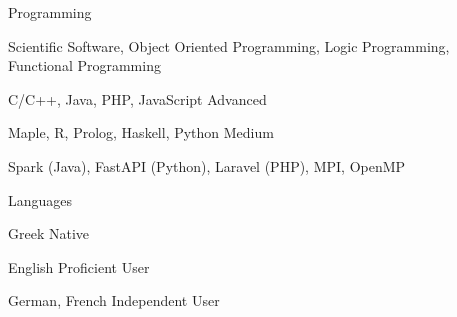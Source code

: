 

\begin{cvskills}


  \cvskill
    {Programming} %
    {
	   	\begin{cvitems}
	   		\item {Scientific Software, Object Oriented Programming, Logic Programming, Functional Programming}
	   		\item {C/C++, Java, PHP, JavaScript {\enskip\cdotp\enskip} Advanced}
	   		\item {Maple, R, Prolog, Haskell, Python {\enskip\cdotp\enskip} Medium}
	   		\item {Spark (Java), FastAPI (Python), Laravel (PHP), MPI, OpenMP}
	 	\end{cvitems}
} %

  \cvskill
    {Languages} %
    {
    	\begin{cvitems}
    		\item {Greek {\enskip\cdotp\enskip} Native}
    		\item {English {\enskip\cdotp\enskip} Proficient User}
    		\item {German, French {\enskip\cdotp\enskip} Independent User}
    	\end{cvitems}
    } %

\end{cvskills}
